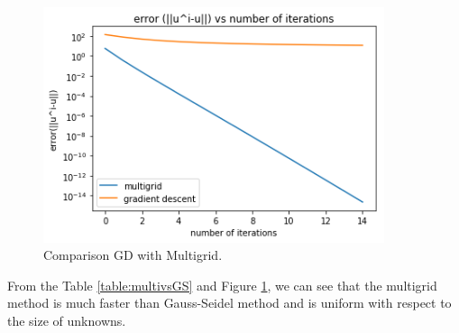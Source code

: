 \vspace{-30pt}
\begin{figure}[!ht]
\centering
\includegraphics[width=10cm]{figures/mgcompare.png}
\caption{ Comparison GD with Multigrid.}
\label{fig:Hmesh}
\end{figure}

From the Table \ref{table:multivsGS} and Figure \ref{fig:Hmesh}, we can see that the multigrid method is much faster than Gauss-Seidel method and is uniform with respect to the size of unknowns. 






